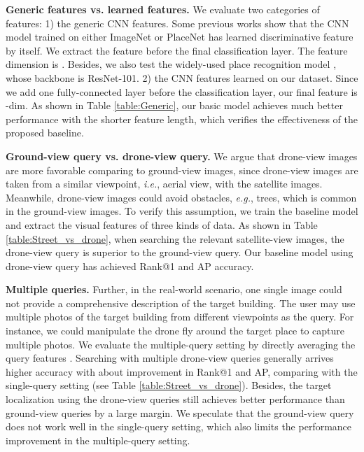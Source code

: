 \documentclass[sigconf]{acmart}
\def\eg{\emph{e.g.}}
\def\ie{\emph{i.e.}}
\begin{document}
\noindent\textbf{Generic features vs. learned features.} We evaluate two categories of features: 1) the generic CNN features. Some previous works \cite{workman2015wide} show that the CNN model trained on either ImageNet \cite{deng2009imagenet} or PlaceNet \cite{zhou2017places} has learned discriminative feature by itself. We extract the feature before the final classification layer. The feature dimension is . Besides, we also test the widely-used place recognition model \cite{radenovic2018fine}, whose backbone is ResNet-101. 
2) the CNN features learned on our dataset. Since we add one fully-connected layer before the classification layer, our final feature is -dim. As shown in Table \ref{table:Generic}, our basic model achieves much better performance with the shorter feature length, which verifies the effectiveness of the proposed baseline. 

\noindent\textbf{Ground-view query vs. drone-view query.} We argue that drone-view images are more favorable comparing to ground-view images, since drone-view images are taken from a similar viewpoint, \ie, aerial view, with the satellite images. Meanwhile, drone-view images could avoid obstacles, \eg, trees, which is common in the ground-view images. To verify this assumption, we train the baseline model and extract the visual features of three kinds of data. As shown in Table \ref{table:Street_vs_drone}, when searching the relevant satellite-view images, the drone-view query is superior to the ground-view query. Our baseline model using drone-view query has achieved  Rank@1 and  AP accuracy. 

\noindent\textbf{Multiple queries.} Further, in the real-world scenario, one single image could not provide a comprehensive description of the target building. The user may use multiple photos of the target building from different viewpoints as the query. For instance, we could manipulate the drone fly around the target place to capture multiple photos. We evaluate the multiple-query setting by directly averaging the query features \cite{zheng2015scalable}. Searching with multiple drone-view queries generally arrives higher accuracy with about  improvement in Rank@1 and AP, comparing with the single-query setting (see Table \ref{table:Street_vs_drone}). Besides, the target localization using the drone-view queries still achieves better performance than ground-view queries by a large margin. We speculate that the ground-view query does not work well in the single-query setting, which also limits the performance improvement in the multiple-query setting. 
\end{document}
